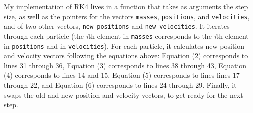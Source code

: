 \documentclass{article}
\begin{document}
My implementation of RK4 lives in a function that takes as arguments the step size, as well as the pointers for the vectors \colorbox{g}{\lstinline[basicstyle=\ttfamily\footnotesize\color{black}]|masses|}, \colorbox{g}{\lstinline[basicstyle=\ttfamily\footnotesize\color{black}]|positions|}, and \colorbox{g}{\lstinline[basicstyle=\ttfamily\footnotesize\color{black}]|velocities|}, and of two other vectors, \colorbox{g}{\lstinline[basicstyle=\ttfamily\footnotesize\color{black}]|new_positions|} and \colorbox{g}{\lstinline[basicstyle=\ttfamily\footnotesize\color{black}]|new_velocities|}. It iterates through each particle (the \textit{i}th element in \colorbox{g}{\lstinline[basicstyle=\ttfamily\footnotesize\color{black}]|masses|} corresponds to the \textit{i}th element in \colorbox{g}{\lstinline[basicstyle=\ttfamily\footnotesize\color{black}]|positions|} and in \colorbox{g}{\lstinline[basicstyle=\ttfamily\footnotesize\color{black}]|velocities|}). For each particle, it calculates new position and velocity vectors following the equations above: Equation (2) corresponds to lines 31 through 36, Equation (3) corresponds to lines 38 through 43, Equation (4) corresponds to lines 14 and 15, Equation (5) corresponds to lines lines 17 through 22, and Equation (6) corresponds to lines 24 through 29. Finally, it swaps the old and new position and velocity vectors, to get ready for the next step.
\end{document}
